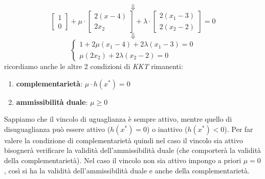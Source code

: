 \documentclass[a4paper,12pt, oneside]{book}
\begin{document}
\[\Downarrow\]
\[\left[
    \begin{matrix}
      1\\
      0
    \end{matrix}
  \right]+\mu\cdot \left[
    \begin{matrix}
      2(x-4)\\
      2x_2
    \end{matrix}
  \right]+\lambda\cdot \left[
    \begin{matrix}
      2(x_1-3)\\
      2(x_2-2)
    \end{matrix}
  \right]=0
\]
\[\Downarrow\]
\[
  \begin{cases}
    1+2\mu(x_1-4)+2\lambda(x_1-3)=0\\
    \mu(2x_2)+2\lambda(x_2-2)=0
  \end{cases}
\]
ricordiamo anche le altre 2 condizioni di \textit{KKT} rimanenti:
\begin{enumerate}
  \item \textbf{complementarietà}: $\mu\cdot h(x^*)=0$
  \item \textbf{ammissibilità duale}: $\mu\geq 0$
\end{enumerate}
Sappiamo che il vincolo di uguaglianza è sempre attivo, mentre quello
di disuguaglianza può essere attivo ($h(x^*)=0$) o inattivo
($h(x^*)<0$). Per far valere la condizione di complementarietà quindi
nel caso il vincolo sia attivo bisognerà verificare la validità
dell'ammissibilità duale (che comporterà la validità della
complementarietà). Nel caso il vincolo non sia attivo impongo a
priori $\mu=0$, così si ha la validità dell'ammissibilità duale e
anche della complementarietà.
\newpage
\end{document}
